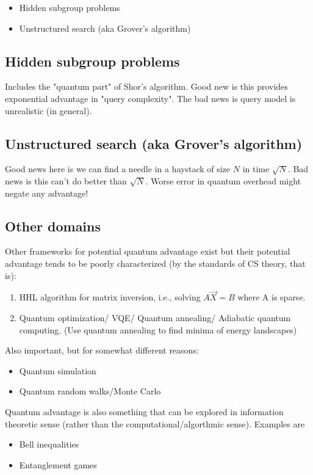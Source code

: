 \documentclass{article}
\begin{document}
\begin{itemize}
    \item Hidden subgroup problems
    \item Unstructured search (aka Grover's algorithm)
\end{itemize}

\subsection*{Hidden subgroup problems}

Includes the "quantum part" of Shor's algorithm. Good new is this provides exponential advantage in "query complexity". The bad news is query model is unrealistic (in general).

\subsection*{Unstructured search (aka Grover's algorithm)}

Good news here is we can find a needle in a haystack of size $N$ in time $\sqrt{N}$. Bad news is this can't do better than $\sqrt{N}$. Worse error in quantum overhead might negate any advantage!

\subsection*{Other domains}
Other frameworks for potential quantum advantage exist but their potential advantage tends to be poorly characterized (by the standards of CS theory, that is):
\begin{enumerate}
    \item HHL algorithm for matrix inversion, i.e., solving $A\vec X = B$ where A is sparse.
    \item Quantum optimization/ VQE/ Quantum annealing/ Adiabatic quantum computing. (Use quantum annealing to find minima of energy landscapes)
\end{enumerate}

Also important, but for somewhat different reasons:
\begin{itemize}
    \item Quantum simulation
    \item Quantum random walks/Monte Carlo
\end{itemize}

Quantum advantage is also something that can be explored in information theoretic sense (rather than the computational/algorthmic sense). Examples are
\begin{itemize}
    \item Bell inequalities
    \item Entanglement games
\end{itemize}
\end{document}
